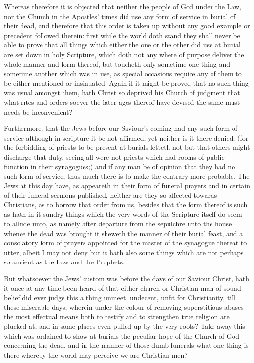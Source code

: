 Whereas therefore it is objected that neither the people of God under the Law, nor the Church in the Apostles’ times did use any form of service in burial of their dead, and therefore that this order is taken up without any good example or precedent followed therein: first while the world doth stand they shall never be able to prove that all things which either the one or the other did use at burial are set down in holy Scripture, which doth not any where of purpose deliver the whole manner and form thereof, but toucheth only sometime one thing and sometime another which was in use, as special occasions require any of them to be either mentioned or insinuated. Again if it might be proved that no such thing was usual amongst them, hath Christ so deprived his Church of judgment that what rites and orders soever the later ages thereof have devised the same must needs be inconvenient?

Furthermore, that the Jews before our Saviour’s coming had any such form of service although in scripture it be not affirmed, yet neither is it there denied; (for the forbidding  of priests to be present at burials letteth not but that others might discharge that duty, seeing all were not priests which had rooms of public function in their synagogues;) and if any man be of opinion that they had no such form of service, thus much there is to make the contrary more probable. The Jews at this day have, as appeareth in their form of funeral prayers and in certain of their funeral sermons published, neither are they so affected towards Christians, as to borrow that order from us, besides that the form thereof is such as hath in it sundry things which the very words of the Scripture itself do seem to allude unto, as namely after departure from the sepulchre unto the house whence the dead was brought it sheweth the manner of their burial feast, and a consolatory form of prayers appointed for the master of the synagogue thereat to utter, albeit I may not deny but it hath also some  things which are not perhaps so ancient as the Law and the Prophets.

But whatsoever the Jews’ custom was before the days of our Saviour Christ, hath it once at any time been heard of that either church or Christian man of sound belief did ever judge this a thing unmeet, undecent, unfit for Christianity, till these miserable days, wherein under the colour of removing superstitious abuses the most effectual means both to testify and to strengthen true religion are plucked at, and in some places even pulled up by the very roots? Take away this which was ordained to show at burials the peculiar hope of the Church of God concerning the dead, and in the manner of those dumb funerals what one thing is there whereby the world may perceive we are Christian men?


